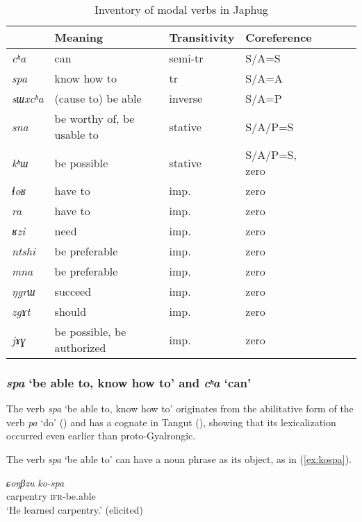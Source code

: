 \documentclass[oneside,a4paper,11pt]{article}
\newcommand{\ipa}[1]{\textit{\phon#1}}
\newcommand{\jpg}[2]{\ipa{#1} `#2'}
\newcommand{\refb}[1]{(\ref{#1})}
\begin{document}
\begin{table}[H]
\caption{Inventory of modal verbs in Japhug} \centering \label{tab:modal.verbs}
\begin{tabular}{lllllll}
\toprule
 & 	Meaning & 	Transitivity & 	Coreference & 	\\
 \midrule
\ipa{cʰa} & 	can & 	semi-tr & 	S/A=S & 	\\
\ipa{spa} & 	know how to & 	tr & 	S/A=A & 	\\
\ipa{sɯxcʰa} & 	(cause to) be able & 	inverse & 	S/A=P & 	\\
\ipa{sna} & 	be worthy of, be usable to & 	stative & 	S/A/P=S & 	\\
\ipa{kʰɯ} & 	be possible & 	stative & 	S/A/P=S, zero & 	\\
\midrule
\ipa{ɬoʁ} & 	have to & 	imp. & 	zero & 	\\
\ipa{ra} & 	have to & 	imp. & 	zero & 	\\
\ipa{ʁzi} & 	need & 	imp. & 	zero & 	\\
\ipa{ntshi} & 	be preferable & 	imp. & 	zero & 	\\
\ipa{mna} & 	be preferable & 	imp. & 	zero & 	\\
\ipa{ŋgrɯ} & 	succeed & 	imp. & 	zero & 	\\
\ipa{zgɤt} & 	should & 	imp. & 	zero & 	\\
\ipa{jɤɣ} & 	be possible, be authorized & 	imp. & 	zero & 	\\
\bottomrule
\end{tabular}
\end{table}

\subsubsection{\jpg{spa}{be able to, know how to} and \jpg{cʰa}{can}} \label{sec:spa}
The verb \jpg{spa}{be able to, know how to} originates from the abilitative form of the verb \ipa{pa} `do' (\citealt{jacques15causative}) and has a cognate in Tangut  (\citealt[255-6]{jacques14esquisse}), showing that its lexicalization occurred even earlier than proto-Gyalrongic.

The verb \jpg{spa}{be able to} can have a noun phrase as its object, as  in \refb{ex:kospa}.

\begin{exe}
\ex \label{ex:kospa}
\gll \ipa{ɕoŋβzu}	\ipa{ko-spa} \\
carpentry \textsc{ifr}-be.able \\
\glt `He learned carpentry.' (elicited)
\end{exe}
\end{document}
